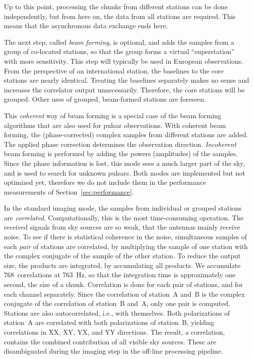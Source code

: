 \documentclass{sig-alternate}
\begin{document}
Up to this point, processing the chunks from different stations can be done
independently, but from here on, the data from all stations are required.
This means that the asynchronous data exchange ends here.

The next step, called \emph{beam forming}, is optional, and adds the samples
from a group of co-located stations, so that the group forms a virtual
``superstation'' with more sensitivity.
This step will typically be used in European observations.
From the perspective of an international station, the baselines to the core
stations are nearly identical.
Treating the baselines separately makes no sense and increases the correlator
output unnecessarily.
Therefore, the core stations will be grouped.
Other uses of grouped, beam-formed stations are foreseen.

This \emph{coherent\/} way of beam forming is a special case of the beam
forming algorithms that are also used for pulsar observations.
With coherent beam forming, the (phase-corrected) complex samples from
different stations are added.
The applied phase correction determines the observation direction.
\emph{Incoherent\/} beam forming is performed by adding the powers (amplitudes)
of the samples.
Since the phase information is lost, this mode sees a much larger part of the
sky, and is used to search for unknown pulsars.
Both modes are implemented but not optimized yet, therefore we do not include
them in the performance measurements of Section~\ref{sec:performance}.

In the standard imaging mode, the samples from individual or grouped stations
are \emph{correlated}.
Computationally, this is the most time-consuming operation.
The received signals from sky sources are so weak, that the antennas mainly
receive noise.
To see if there is statistical coherence in the noise, simultaneous samples of
each \emph{pair\/} of stations are correlated, by multiplying the sample of one
station with the complex conjugate of the sample of the other station.
To reduce the output size, the products are integrated, by accumulating all
products.
We accumulate 768~correlations at 763~Hz, so that the integration time is
approximately one second, the size of a chunk.
Correlation is done for each pair of stations, and for each channel separately.
Since the correlation of station~A and~B is the complex conjugate of the
correlation of station~B and~A, only one pair is computed.
Stations are also autocorrelated, i.e., with themselves.
Both polarizations of station~A are correlated with both polarizations of
station~B, yielding correlations in XX, XY, YX, and YY directions.
The result, a correlation, contains the combined contribution of all visible
sky sources.
These are disambiguated during the imaging step in the off-line processing
pipeline.
\end{document}
